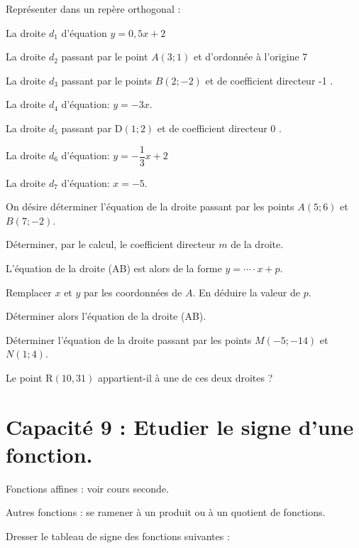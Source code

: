 \documentclass[10pt,a4paper]{article}  %
\begin{document}
\vspace*{-0.7cm}
\exerciceDS{}
Représenter dans un repère orthogonal :

\begin{enumMet}
  \item La droite $d_{1}$ d'équation $y=0,5 x+2$
  \item La droite $d_{2}$ passant par le point $A(3 ; 1)$ et d'ordonnée à l'origine 7
  \item La droite $d_{3}$ passant par le points $B(2 ;-2)$ et de coefficient directeur -1 .
  \item La droite $d_{4}$ d'équation: $y=-3 x$.
  \item La droite $d_{5}$ passant par $\mathrm{D}(1 ; 2)$ et de coefficient directeur 0 .
  \item La droite $d_{6}$ d'équation: $y=-\dfrac{1}{3} x+2$
  \item La droite $d_{7}$ d'équation: $x=-5$.
\end{enumMet}
\vspace*{-0.8cm}
\exerciceDS{}
\begin{enumMet}
  \item On désire déterminer l'équation de la droite passant par les points $A(5 ; 6)$ et $B(7 ;-2)$.
\begin{enumMet}
	\item Déterminer, par le calcul, le coefficient directeur $m$ de la droite.
	\item L'équation de la droite (AB) est alors de la forme $y=\cdots \cdot x+p$.
	\item Remplacer $x$ et $y$ par les coordonnées de $A$. En déduire la valeur de $p$.
	\item Déterminer alors l'équation de la droite (AB).
\end{enumMet}
  \item Déterminer l'équation de la droite passant par les points $M(-5 ;-14)$ et $N(1 ; 4)$.
  \item Le point $\mathrm{R}(10,31)$ appartient-il à une de ces deux droites ?
\end{enumMet}

\section*{Capacité 9 : Etudier le signe d'une fonction.}
\begin{brappel}
	\begin{itemMet}
		\item Fonctions affines : voir cours seconde.
		\item Autres fonctions : se ramener à un produit ou à un quotient de fonctions.
	\end{itemMet}
\end{brappel}
\vspace*{-0.7cm}
\exerciceDS{}
Dresser le tableau de signe des fonctions suivantes :
\end{document}
